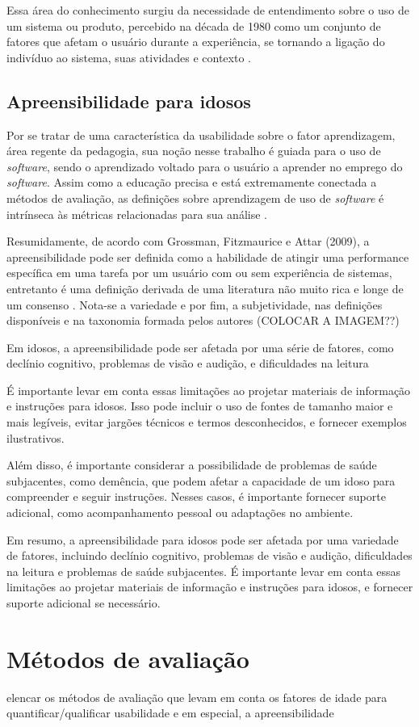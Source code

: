 Essa área do conhecimento surgiu da necessidade de entendimento sobre o uso de um sistema ou produto, percebido na década de 1980 como um conjunto de fatores que afetam o usuário durante a experiência, se tornando a ligação do indivíduo ao sistema, suas atividades e contexto \cite{weichbroth_usability_2020}. 

\subsection{Apreensibilidade para idosos} 
Por se tratar de uma característica da usabilidade sobre o fator aprendizagem, área regente da pedagogia, sua noção nesse trabalho é guiada para o uso de \emph{software}, sendo o aprendizado voltado para o usuário a aprender no emprego do \emph{software}. Assim como a educação precisa e está extremamente conectada a métodos de avaliação, as definições sobre aprendizagem de uso de \emph{software} é intrínseca às métricas relacionadas para sua análise \cite{grossman_survey_2009}.

Resumidamente, de acordo com Grossman, Fitzmaurice e Attar (2009), a apreensibilidade pode ser definida como a habilidade de atingir uma performance específica em uma tarefa por um usuário com ou sem experiência de sistemas, entretanto é uma definição derivada de uma literatura não muito rica e longe de um consenso \cite{grossman_survey_2009}. Nota-se a variedade e por fim, a subjetividade, nas definições disponíveis e na taxonomia formada pelos autores (COLOCAR A IMAGEM??)

Em idosos, a apreensibilidade pode ser afetada por uma série de fatores, como declínio cognitivo, problemas de visão e audição, e dificuldades na leitura \cite{w3c_older}

É importante levar em conta essas limitações ao projetar materiais de informação e instruções para idosos. Isso pode incluir o uso de fontes de tamanho maior e mais legíveis, evitar jargões técnicos e termos desconhecidos, e fornecer exemplos ilustrativos.

Além disso, é importante considerar a possibilidade de problemas de saúde subjacentes, como demência, que podem afetar a capacidade de um idoso para compreender e seguir instruções. Nesses casos, é importante fornecer suporte adicional, como acompanhamento pessoal ou adaptações no ambiente.

Em resumo, a apreensibilidade para idosos pode ser afetada por uma variedade de fatores, incluindo declínio cognitivo, problemas de visão e audição, dificuldades na leitura e problemas de saúde subjacentes. É importante levar em conta essas limitações ao projetar materiais de informação e instruções para idosos, e fornecer suporte adicional se necessário.

\section{Métodos de avaliação}
elencar os métodos de avaliação que levam em conta os fatores de idade para quantificar/qualificar usabilidade e em especial, a apreensibilidade


